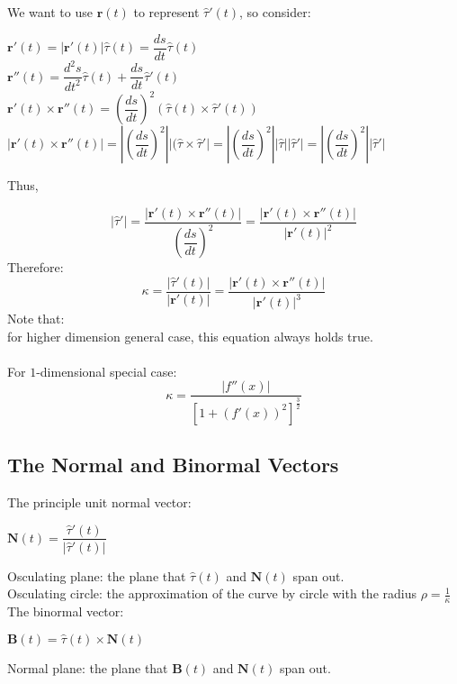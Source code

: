 \documentclass[UTF8,a4paper, 10pt, openany]{book}
\begin{document}
We want to use $\mathbf{r}(t)$ to represent $\hat{\tau}'(t)$, so consider:

\begin{center}
$\mathbf{r}'(t)=|\mathbf{r}'(t)|\hat{\tau}(t)=\dfrac{ds}{dt}\hat{\tau}(t)$\\
$\mathbf{r}''(t)=\dfrac{d^2s}{dt^2}\hat{\tau}(t)+\dfrac{ds}{dt}\hat{\tau}'(t)$\\
$\mathbf{r}'(t)\times \mathbf{r}''(t)=(\dfrac{ds}{dt})^2(\hat{\tau}(t)\times \hat{\tau}'(t))$\\
$|\mathbf{r}'(t)\times \mathbf{r}''(t)|=|(\dfrac{ds}{dt})^2||(\hat{\tau}\times \hat{\tau}'|=|(\dfrac{ds}{dt})^2||\hat{\tau}||\hat{\tau}'|=|(\dfrac{ds}{dt})^2||\hat{\tau}'|$
\end{center}

Thus,

\begin{equation}
\boxed{|\hat{\tau}'|=\dfrac{|\mathbf{r}'(t)\times \mathbf{r}''(t)|}{(\dfrac{ds}{dt})^2}=\dfrac{|\mathbf{r}'(t)\times \mathbf{r}''(t)|}{|\mathbf{r}'(t)|^2}}
\end{equation}
Therefore:
\begin{equation}
\boxed{\kappa=\dfrac{|\hat{\tau}'(t)|}{|\mathbf{r}'(t)|}=\dfrac{|\mathbf{r}'(t)\times \mathbf{r}''(t)|}{|\mathbf{r}'(t)|^3}}
\end{equation}
Note that:\\
for higher dimension general case, this equation always holds true.\\ \\
For $1$-dimensional special case:
\begin{equation}
\boxed{\kappa=\dfrac{|f''(x)|}{[1+(f'(x))^2]^{\frac{3}{2}}}}
\end{equation}
\subsection{The Normal and Binormal Vectors}
The principle unit normal vector:
\begin{center}
$\mathbf{N}(t)=\dfrac{\hat{\tau}'(t)}{|\hat{\tau}'(t)|}$
\end{center}
Osculating plane: the plane that $\hat{\tau}(t)$ and $\mathbf{N}(t)$ span out.\\
Osculating circle: the approximation of the curve by circle with the radius $\rho = \frac{1}{\kappa}$\\
The binormal vector:
\begin{center}
$\mathbf{B}(t)=\hat{\tau}(t)\times \mathbf{N}(t)$
\end{center}
Normal plane: the plane that $\mathbf{B}(t)$ and $\mathbf{N}(t)$ span out.
\end{document}
